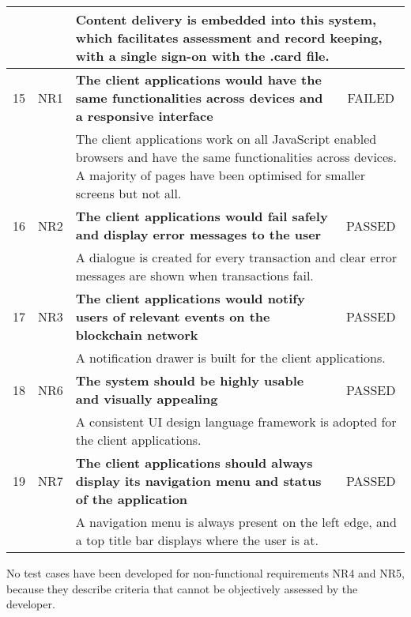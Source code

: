 \begin{table}[!ht]
\begin{tabularx}{\textwidth}{|c|c|X|c|}
		\hline
		   &      & \multicolumn{2}{X|}{Content delivery is embedded into this system, which facilitates
			assessment and record keeping, with a single sign-on with the .card file.}                                                            \\
        \hline
        15 & NR1 & \textbf{The client applications would have the same functionalities
        across devices and a responsive interface} & \cellcolor{pink}FAILED \\
		\hline
           &      & \multicolumn{2}{X|}{The client applications work on all 
           JavaScript enabled browsers and have the same functionalities across devices.
           A majority of pages have been optimised for smaller screens but not all.}      \\
        \hline
        16 & NR2 & \textbf{The client applications would fail safely and display error messages
		to the user} & \cellcolor{green}PASSED \\
		\hline
           &      & \multicolumn{2}{X|}{A dialogue is created for every transaction 
           and clear error messages are shown when transactions fail.}      \\
        \hline
        17 & NR3 & \textbf{The client applications would notify users of relevant
        events on the blockchain network} & \cellcolor{green}PASSED \\
		\hline
           &      & \multicolumn{2}{X|}{A notification drawer is built for the client applications.}      \\
        \hline
        18 & NR6 & \textbf{The system should be highly usable and visually appealing} & \cellcolor{green}PASSED \\
		\hline
           &      & \multicolumn{2}{X|}{A consistent UI design language framework is adopted for the client applications.}      \\
        \hline
        19 & NR7 & \textbf{The client applications should always display its navigation menu and status of the application} & \cellcolor{green}PASSED \\
		\hline
           &      & \multicolumn{2}{X|}{A navigation menu is always present on the left edge, and a top title bar displays where the user is at.}      \\
        \hline
	\end{tabularx}
\end{table}

No test cases have been developed for non-functional requirements NR4 and NR5, 
because they describe criteria that cannot be objectively assessed by the developer.